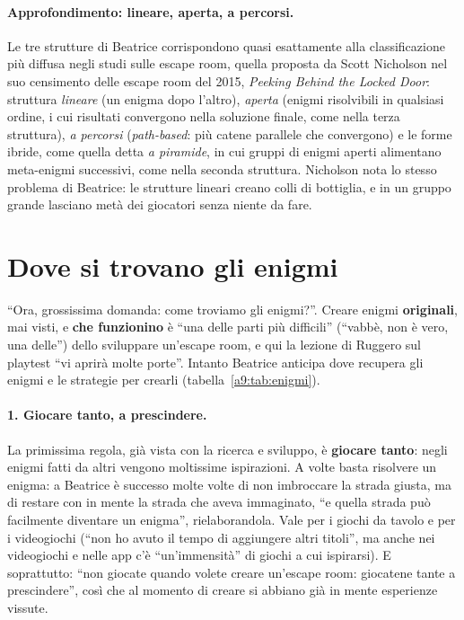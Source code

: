 \paragraph{Approfondimento: lineare, aperta, a percorsi.} Le tre strutture di
Beatrice corrispondono quasi esattamente alla classificazione più diffusa negli studi
sulle escape room, quella proposta da Scott Nicholson nel suo censimento delle
escape room del 2015, \emph{Peeking Behind the Locked Door}: struttura
\emph{lineare} (un enigma dopo l'altro), \emph{aperta} (enigmi risolvibili in
qualsiasi ordine, i cui risultati convergono nella soluzione finale, come nella terza
struttura), \emph{a percorsi} (\emph{path-based}: più catene parallele che
convergono) e le forme ibride, come quella detta \emph{a piramide}, in cui gruppi di
enigmi aperti alimentano meta-enigmi successivi, come nella seconda struttura. Nicholson
nota lo stesso problema di Beatrice: le strutture lineari creano colli di bottiglia,
e in un gruppo grande lasciano metà dei giocatori senza niente da fare.

\section{Dove si trovano gli enigmi}
\label{a9:sec:enigmi}



``Ora, grossissima domanda: come troviamo gli enigmi?''. Creare enigmi
\textbf{originali}, mai visti, e \textbf{che funzionino} è ``una delle parti più
difficili'' (``vabbè, non è vero, una delle'') dello sviluppare un'escape room, e
qui la lezione di Ruggero sul playtest ``vi aprirà molte porte''. Intanto Beatrice
anticipa dove recupera gli enigmi e le strategie per crearli (tabella~\ref{a9:tab:enigmi}).

\paragraph{1. Giocare tanto, a prescindere.} La primissima regola, già vista con la
ricerca e sviluppo, è \textbf{giocare tanto}: negli enigmi fatti da altri vengono
moltissime ispirazioni. A volte basta risolvere un enigma: a Beatrice è successo
molte volte di non imbroccare la strada giusta, ma di restare con in mente la strada
che aveva immaginato, ``e quella strada può facilmente diventare un enigma'',
rielaborandola. Vale per i giochi da tavolo e per i videogiochi (``non ho avuto il
tempo di aggiungere altri titoli'', ma anche nei videogiochi e nelle app c'è
``un'immensità'' di giochi a cui ispirarsi). E soprattutto: ``non giocate quando volete
creare un'escape room: giocatene tante a prescindere'', così che al momento di creare
si abbiano già in mente esperienze vissute.

